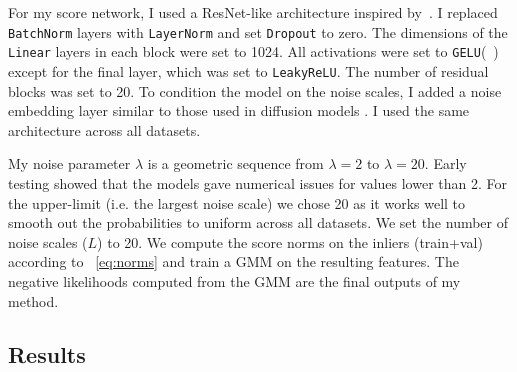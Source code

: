 For my score network, I used a ResNet-like architecture inspired by~\cite{gorishniy2021revisiting}. I replaced \texttt{BatchNorm} layers with \texttt{LayerNorm} and set \texttt{Dropout} to zero. The dimensions of the \texttt{Linear} layers in each block were set to 1024. All activations were set to \texttt{GELU}(~\cite{gelu}) except for the final layer, which was set to \texttt{LeakyReLU}. The number of residual blocks was set to 20. 
To condition the model on the noise scales, I added a noise embedding layer similar to those used in diffusion models \cite{song2020score}. I used the same architecture across all datasets.

My noise parameter $\lambda$ is a geometric sequence from $\lambda=2$ to $\lambda=20$. Early testing showed that the models gave numerical issues for values lower than 2. For the upper-limit (i.e. the largest noise scale) we chose 20 as it works well to smooth out the probabilities to uniform across all datasets. We set the number of noise scales ($L$) to 20. We compute the score norms on the inliers (train+val) according to ~\ref{eq:norms} and train a GMM on the resulting features. The negative likelihoods computed from the GMM are the final outputs of my method.

\subsection*{Results}

